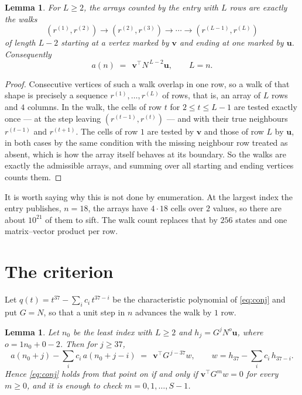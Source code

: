 \documentclass[11pt,a4paper]{article}
\theoremstyle{plain}
\newtheorem{lemma}[theorem]{Lemma}
\theoremstyle{definition}
\begin{document}
\begin{lemma}\label{lem:walk}
For $L\ge2$, the arrays counted by the entry with $L$ rows are exactly the walks
\[
(r^{(1)},r^{(2)})\to(r^{(2)},r^{(3)})\to\cdots\to(r^{(L-1)},r^{(L)})
\]
of length $L-2$ starting at a vertex marked by $\mathbf{v}$ and ending at one marked by
$\mathbf{u}$. Consequently
\[
a(n)\;=\;\,\mathbf{v}^{\!\top}N^{\,L-2}\mathbf{u},\qquad L=n .
\]
\end{lemma}

\begin{proof}
Consecutive vertices of such a walk overlap in one row, so a walk of that shape is
precisely a sequence $r^{(1)},\dots,r^{(L)}$ of rows, that is, an array of $L$ rows
and $4$ columns. In the walk, the cells of row $t$ for $2\le t\le L-1$ are tested
exactly once --- at the step leaving $(r^{(t-1)},r^{(t)})$ --- and with their true
neighbours $r^{(t-1)}$ and $r^{(t+1)}$. The cells of row $1$ are tested by
$\mathbf{v}$ and those of row $L$ by $\mathbf{u}$, in both cases by the same condition
with the missing neighbour row treated as absent, which is how the array itself behaves at
its boundary. So the walks are exactly the admissible arrays, and summing over all starting
and ending vertices counts them.
\end{proof}


It is worth saying why this is not done by enumeration. At the largest index the entry
publishes, $n=18$, the arrays have $4\cdot18$ cells over
$2$ values, so there are about $10^{21}$ of them to sift. The
walk count replaces that by $256$ states and one matrix--vector product per row.
\section{The criterion}

Let $q(t)=t^{37}-\sum_i c_i\,t^{37-i}$ be the characteristic polynomial of
\eqref{eq:conj} and put $G=N$, so that a unit step in $n$ advances the walk by
$1$ row.

\begin{lemma}\label{lem:crit}
Let $n_0$ be the least index with $L\ge2$ and $h_j=G^{j}N^{o}\mathbf{u}$, where
$o=1n_0+0-2$. Then for $j\ge37$,
\[
a(n_0+j)-\sum_i c_i\,a(n_0+j-i)\;=\;\,\mathbf{v}^{\!\top}G^{\,j-37}w,
\qquad w=h_{37}-\sum_i c_i\,h_{37-i} .
\]
Hence \eqref{eq:conj} holds from that point on if and only if
$\mathbf{v}^{\!\top}G^{m}w=0$ for every $m\ge0$, and it is enough to check
$m=0,1,\dots,S-1$.
\end{lemma}
\end{document}
